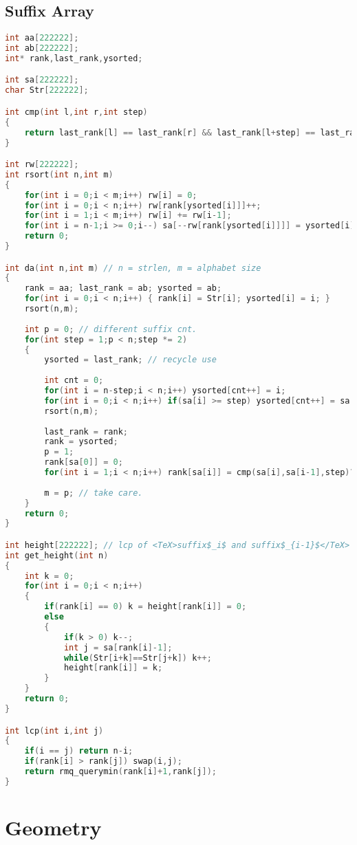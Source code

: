 \subsection{Suffix Array}
\begin{lstlisting}[language=C++]
int aa[222222];
int ab[222222];
int* rank,last_rank,ysorted;

int sa[222222];
char Str[222222];

int cmp(int l,int r,int step)
{
	return last_rank[l] == last_rank[r] && last_rank[l+step] == last_rank[r+step];
}

int rw[222222]; 
int rsort(int n,int m)
{
	for(int i = 0;i < m;i++) rw[i] = 0;
	for(int i = 0;i < n;i++) rw[rank[ysorted[i]]]++;
	for(int i = 1;i < m;i++) rw[i] += rw[i-1];
	for(int i = n-1;i >= 0;i--) sa[--rw[rank[ysorted[i]]]] = ysorted[i]; // keep order
	return 0;
}

int da(int n,int m) // n = strlen, m = alphabet size
{
	rank = aa; last_rank = ab; ysorted = ab;
	for(int i = 0;i < n;i++) { rank[i] = Str[i]; ysorted[i] = i; }
	rsort(n,m);
	
	int p = 0; // different suffix cnt.
	for(int step = 1;p < n;step *= 2)
	{
		ysorted = last_rank; // recycle use
		
		int cnt = 0;
		for(int i = n-step;i < n;i++) ysorted[cnt++] = i;
		for(int i = 0;i < n;i++) if(sa[i] >= step) ysorted[cnt++] = sa[i]-step;
		rsort(n,m);
		
		last_rank = rank;
		rank = ysorted;
		p = 1;
		rank[sa[0]] = 0;
		for(int i = 1;i < n;i++) rank[sa[i]] = cmp(sa[i],sa[i-1],step)?p-1:p++;
		
		m = p; // take care.
	}
	return 0;
}

int height[222222]; // lcp of <TeX>suffix$_i$ and suffix$_{i-1}$</TeX>
int get_height(int n)
{
	int k = 0;
	for(int i = 0;i < n;i++)
	{
		if(rank[i] == 0) k = height[rank[i]] = 0;
		else
		{
			if(k > 0) k--;
			int j = sa[rank[i]-1];
			while(Str[i+k]==Str[j+k]) k++;
			height[rank[i]] = k;
		}
	}
	return 0;
}

int lcp(int i,int j)
{
	if(i == j) return n-i;
	if(rank[i] > rank[j]) swap(i,j);
	return rmq_querymin(rank[i]+1,rank[j]);
}
\end{lstlisting}

\section{Geometry}

